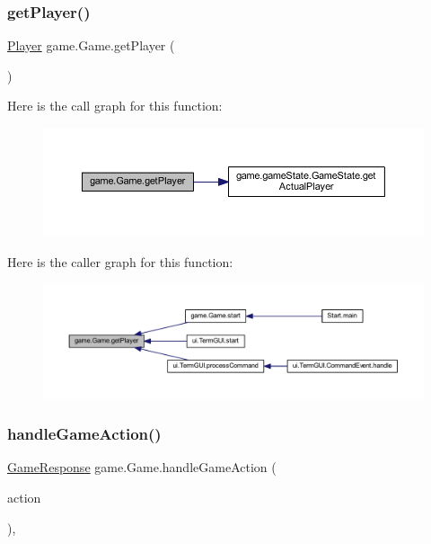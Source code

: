 \subsubsection{\texorpdfstring{get\+Player()}{getPlayer()}}
{\footnotesize\ttfamily \mbox{\hyperlink{interfaceplayer_1_1_player}{Player}} game.\+Game.\+get\+Player (\begin{DoxyParamCaption}{ }\end{DoxyParamCaption})\hspace{0.3cm}{\ttfamily [inline]}}

Here is the call graph for this function\+:
\nopagebreak
\begin{figure}[H]
\begin{center}
\leavevmode
\includegraphics[width=350pt]{classgame_1_1_game_aef9aa5894fc276e5699e323156463e24_cgraph}
\end{center}
\end{figure}
Here is the caller graph for this function\+:
\nopagebreak
\begin{figure}[H]
\begin{center}
\leavevmode
\includegraphics[width=350pt]{classgame_1_1_game_aef9aa5894fc276e5699e323156463e24_icgraph}
\end{center}
\end{figure}
\mbox{\label{classgame_1_1_game_a1847ff6b22bd747cc2983a261a79aed2}} 
\subsubsection{\texorpdfstring{handle\+Game\+Action()}{handleGameAction()}}
{\footnotesize\ttfamily \mbox{\hyperlink{classui_1_1_game_response}{Game\+Response}} game.\+Game.\+handle\+Game\+Action (\begin{DoxyParamCaption}\item[{\mbox{\hyperlink{classrule_engine_1_1_game_action}{Game\+Action}}}]{action }\end{DoxyParamCaption})\hspace{0.3cm}{\ttfamily [inline]}, {\ttfamily [private]}}

